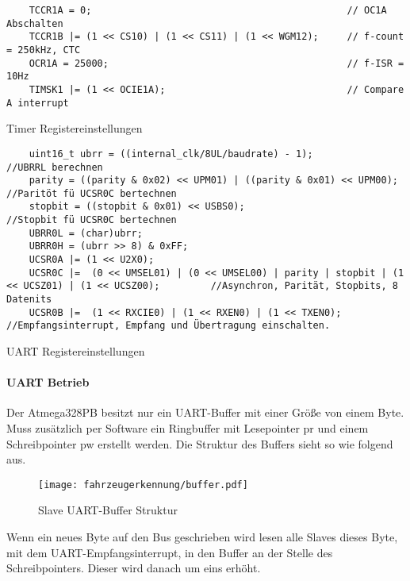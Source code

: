 \begin{listing}[H]
    \begin{verbatim}
    TCCR1A = 0;                                             // OC1A Abschalten
    TCCR1B |= (1 << CS10) | (1 << CS11) | (1 << WGM12);     // f-count = 250kHz, CTC
    OCR1A = 25000;                                          // f-ISR = 10Hz
    TIMSK1 |= (1 << OCIE1A);                                // Compare A interrupt
    \end{verbatim}
    \caption{Timer Registereinstellungen}
\end{listing}


\begin{listing}[H]
    \begin{verbatim}
    uint16_t ubrr = ((internal_clk/8UL/baudrate) - 1);                      //UBRRL berechnen
    parity = ((parity & 0x02) << UPM01) | ((parity & 0x01) << UPM00);       //Paritöt fü UCSR0C bertechnen
    stopbit = ((stopbit & 0x01) << USBS0);                                  //Stopbit fü UCSR0C bertechnen
    UBRR0L = (char)ubrr;
    UBRR0H = (ubrr >> 8) & 0xFF;
    UCSR0A |= (1 << U2X0);
    UCSR0C |=  (0 << UMSEL01) | (0 << UMSEL00) | parity | stopbit | (1 << UCSZ01) | (1 << UCSZ00);         //Asynchron, Parität, Stopbits, 8 Datenits
    UCSR0B |=  (1 << RXCIE0) | (1 << RXEN0) | (1 << TXEN0);                 //Empfangsinterrupt, Empfang und Übertragung einschalten.      
    \end{verbatim}
    \caption{UART Registereinstellungen}
\end{listing}



\paragraph{UART Betrieb}\mbox{} 

Der Atmega328PB besitzt nur ein UART-Buffer mit einer Größe von einem Byte. Muss
zusätzlich per Software ein Ringbuffer mit Lesepointer pr und einem Schreibpointer pw erstellt
werden. Die Struktur des Buffers sieht so wie folgend aus.

\begin{figure}[H]
    \centering
    \texttt{[image: fahrzeugerkennung/buffer.pdf]}
    \caption{Slave UART-Buffer Struktur}
\end{figure}

Wenn ein neues Byte auf den Bus geschrieben wird lesen alle Slaves dieses Byte, mit dem UART-Empfangsinterrupt, in den Buffer an der Stelle des Schreibpointers. Dieser wird danach um eins
erhöht.


